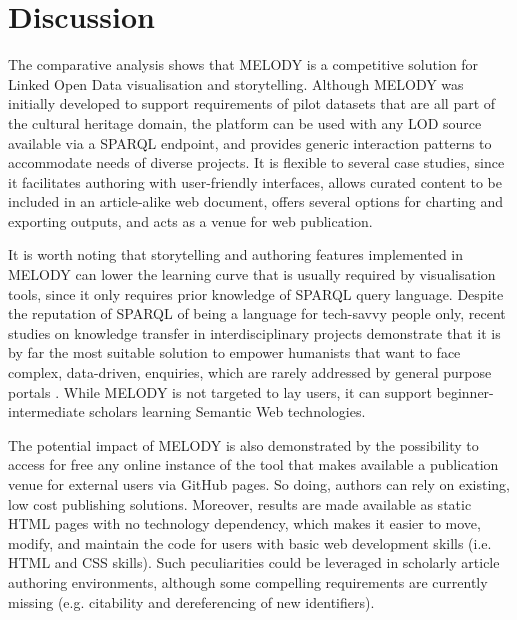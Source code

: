\documentclass[manuscript]
{acmart}
\begin{document}
\section{Discussion} \label{discussion}
The comparative analysis shows that MELODY is a competitive solution for Linked Open Data visualisation and storytelling. Although MELODY was initially developed to support requirements of pilot datasets that are all part of the cultural heritage domain, the platform can be used with any LOD source available via a SPARQL endpoint, and provides generic interaction patterns to accommodate needs of diverse projects. It is flexible to several case studies, since it facilitates authoring with user-friendly interfaces, allows curated content to be included in an article-alike web document, offers several options for charting and exporting outputs, and acts as a venue for web publication.

It is worth noting that storytelling and authoring features implemented in MELODY can lower the learning curve that is usually required by visualisation tools, since it only requires prior knowledge of SPARQL query language. Despite the reputation of SPARQL of being a language for tech-savvy people only, recent studies on knowledge transfer in interdisciplinary projects demonstrate that it is by far the most suitable solution to empower humanists that want to face complex, data-driven, enquiries, which are rarely addressed by general purpose portals \cite{burrows2022medieval}. While MELODY is not targeted to lay users, it can support beginner-intermediate scholars learning Semantic Web technologies.

The potential impact of MELODY is also demonstrated by the possibility to access for free any online instance of the tool that makes available a publication venue for external users via GitHub pages. So doing, authors can rely on existing, low cost publishing solutions. Moreover, results are made available as static HTML pages with no technology dependency, which makes it easier to move, modify, and maintain the code for users with basic web development skills (i.e. HTML and CSS skills). Such peculiarities could be leveraged in scholarly article authoring environments, although some compelling requirements are currently missing (e.g. citability and dereferencing of new identifiers).
\end{document}
